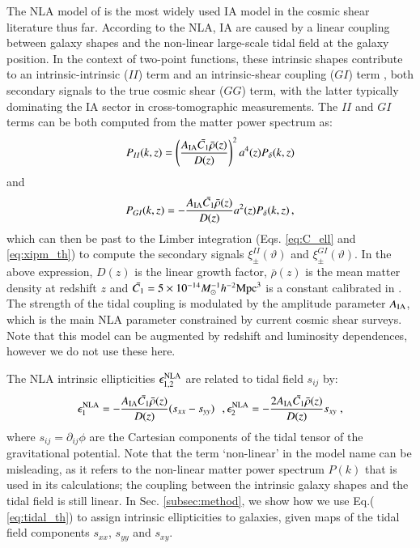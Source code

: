 \documentclass[useAMS,usenatbib]{mn2e}
\begin{document}
 
The NLA model of \citet{NLA} is the most widely used IA model in the cosmic shear literature thus far. According to the NLA, IA are caused by a linear coupling between galaxy shapes and the non-linear large-scale tidal field at the galaxy position. In the context of  two-point functions, these intrinsic shapes contribute to an intrinsic-intrinsic ($II$) term and an intrinsic-shear coupling ($GI$) term \citep{Hirata2004}, both secondary signals to the true cosmic shear ($GG$) term, with the latter typically dominating the IA sector in cross-tomographic measurements.  The $II$ and $GI$ terms  can be both computed from the matter power spectrum as: 
 \begin{eqnarray}
P_{II}(k,z) =  \left(\frac{A_{\rm IA}\bar{C_1}\bar{\rho}(z)}{D(z)}\right)^2a^4(z) P_{\delta}(k,z)
\label{eq:Pk_II_th}
\end{eqnarray}
and
 \begin{eqnarray}
P_{GI}(k,z) = - \frac{A_{\rm IA}\bar{C_1}\bar{\rho}(z)}{D(z)}a^2(z) P_{\delta}(k,z) \, ,
\label{eq:Pk_GI_th}
\end{eqnarray}
which can then be past to the Limber integration (Eqs. \ref{eq:C_ell} and \ref{eq:xipm_th}) to compute  the secondary signals $\xi_{\pm}^{II}(\vartheta)$ and $\xi_{\pm}^{GI}(\vartheta)$. 
In the above expression,  $D(z)$ is the linear growth factor, $\bar{\rho}(z)$ is the mean matter density at redshift $z$ and $\bar{C_1}=5\times 10^{-14} M_{\odot}^{-1} h^{-2} {\rm Mpc}^3$ is a constant calibrated in \citet{Brown2002}. 
The strength of the tidal coupling is modulated by the amplitude parameter $A_{\rm IA}$, which is the main NLA parameter constrained by current cosmic shear surveys. Note that this model can be augmented by redshift and luminosity dependences, however we do not use these here. 


The NLA intrinsic ellipticities $\epsilon_{1,2}^{\rm NLA}$ are related to tidal field $s_{ij}$ by:
 \begin{eqnarray}
\epsilon_1^{\rm NLA} = - \frac{A_{\rm IA}\bar{C_1}\bar{\rho}(z)}{D(z)} (s_{xx} - s_{yy}) \,\,\,\,,   \epsilon_2^{\rm NLA} = - \frac{2 A_{\rm IA}\bar{C_1}\bar{\rho}(z)}{D(z)} s_{xy}\;,
\label{eq:tidal_th}
\end{eqnarray}
where $s_{ij} = \partial_{ij}\phi$ are the Cartesian components of the tidal tensor of the gravitational potential. Note that the term `non-linear' in the model name can be  misleading, as it refers to the non-linear matter power spectrum $P(k)$ that is used in its calculations; the coupling between the intrinsic galaxy shapes and the tidal field is still linear. In Sec. \ref {subsec:method}, we show how we use  Eq.( \ref{eq:tidal_th}) to assign intrinsic ellipticities to galaxies, given maps of the tidal field components $s_{xx}$, $s_{yy}$ and $s_{xy}$.
\end{document}
